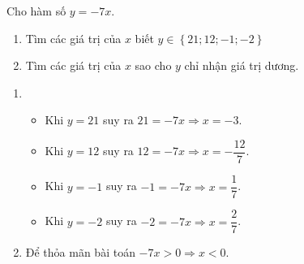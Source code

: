 \begin{bt}%
Cho hàm số $y = - 7x$.
	\begin{enumerate}
		\item Tìm các giá trị của $x$ biết $y\in\left\{21; 12; -1; - 2\right\}$
		\item Tìm các giá trị của $x$ sao cho $y$ chỉ nhận giá trị dương.  
	\end{enumerate}
	\loigiai
	{\begin{enumerate}
			\item 
			\begin{itemize}
				\item Khi $y = 21$ suy ra $21 = - 7x\Rightarrow x = - 3$.
				\item Khi $y = 12$ suy ra $12 = - 7x\Rightarrow x = - \dfrac{12}{7}$.	
				\item Khi $y = - 1$ suy ra $- 1 = - 7x\Rightarrow x =  \dfrac{1}{7}$.
				\item Khi $y = - 2$ suy ra $- 2 = - 7x\Rightarrow x =  \dfrac{2}{7}$.				
			\end{itemize}
			\item Để thỏa mãn bài toán $- 7x > 0\Rightarrow x < 0$.  
		\end{enumerate}	
	}
\end{bt}

